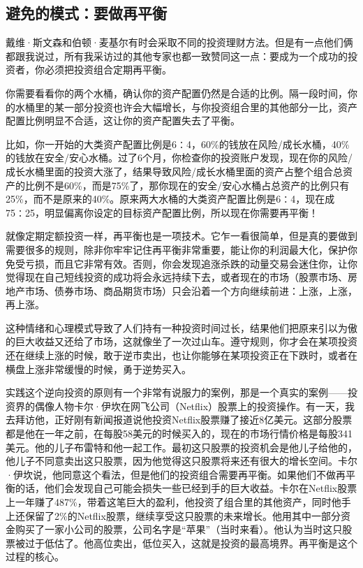 \subsection{避免的模式：要做再平衡}

戴维·斯文森和伯顿·麦基尔有时会采取不同的投资理财方法。但是有一点他们俩都跟我说过，所有我采访过的其他专家也都一致赞同这一点：要成为一个成功的投资者，你必须把投资组合定期再平衡。

你需要看看你的两个水桶，确认你的资产配置仍然是合适的比例。隔一段时间，你的水桶里的某一部分投资也许会大幅增长，与你投资组合里的其他部分一比，资产配置比例明显不合适，这让你的资产配置失去了平衡。

比如，你一开始的大类资产配置比例是6∶4，60\%的钱放在风险/成长水桶，40\%的钱放在安全/安心水桶。过了6个月，你检查你的投资账户发现，现在你的风险/成长水桶里面的投资大涨了，结果导致风险/成长水桶里面的资产占整个组合总资产的比例不是60\%，而是75\%了，那你现在的安全/安心水桶占总资产的比例只有25\%，而不是原来的40\%。原来两大水桶的大类资产配置比例是6∶4，现在成75∶25，明显偏离你设定的目标资产配置比例，所以现在你需要再平衡！

就像定期定额投资一样，再平衡也是一项技术。它乍一看很简单，但是真的要做到需要很多的规则，除非你牢牢记住再平衡非常重要，能让你的利润最大化，保护你免受亏损，而且它非常有效。否则，你会发现追涨杀跌的动量交易会迷住你，让你觉得现在自己短线投资的成功将会永远持续下去，或者现在的市场（股票市场、房地产市场、债券市场、商品期货市场）只会沿着一个方向继续前进：上涨，上涨，再上涨。

这种情绪和心理模式导致了人们持有一种投资时间过长，结果他们把原来引以为傲的巨大收益又还给了市场，这就像坐了一次过山车。遵守规则，你才会在某项投资还在继续上涨的时候，敢于逆市卖出，也让你能够在某项投资正在下跌时，或者在横盘上涨非常缓慢的时候，勇于逆势买入。

实践这个逆向投资的原则有一个非常有说服力的案例，那是一个真实的案例——投资界的偶像人物卡尔·伊坎在网飞公司（Netflix）股票上的投资操作。有一天，我去拜访他，正好刚有新闻报道说他投资Netflix股票赚了接近8亿美元。这部分股票都是他在一年之前，在每股58美元的时候买入的，现在的市场行情价格是每股341美元。他的儿子布雷特和他一起工作。最初这只股票的投资机会是他儿子给他的，他儿子不同意卖出这只股票，因为他觉得这只股票将来还有很大的增长空间。卡尔·伊坎说，他同意这个看法，但是他们的投资组合需要再平衡。如果他们不做再平衡的话，他们会发现自己可能会损失一些已经到手的巨大收益。卡尔在Netflix股票上一年赚了487\%，带着这笔巨大的盈利，他投资了组合里的其他资产，同时他手上还保留了2\%的Netflix股票，继续享受这只股票的未来增长。他用其中一部分资金购买了一家小公司的股票，公司名字是“苹果”（当时来看）。他认为当时这只股票被过于低估了。他高位卖出，低位买入，这就是投资的最高境界。再平衡是这个过程的核心。

